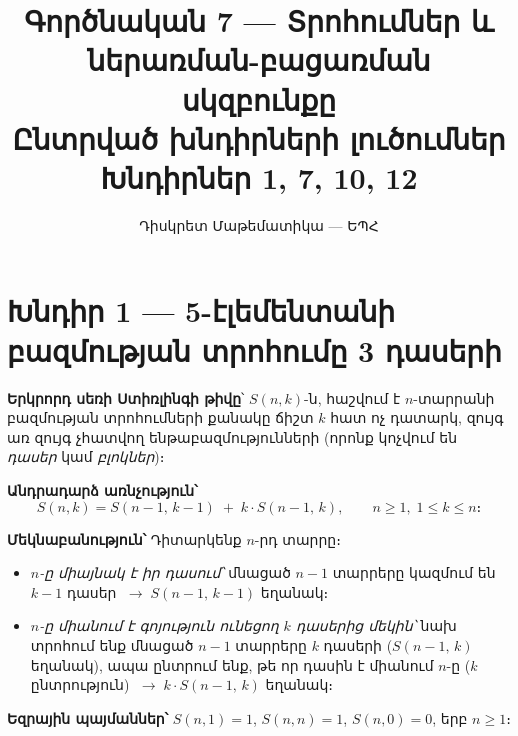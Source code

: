 \documentclass[12pt, a4paper]{article}
\title{\textbf{Գործնական 7 — Տրոհումներ և ներառման-բացառման սկզբունքը}\\[4pt]
       \large Ընտրված խնդիրների լուծումներ\\[2pt]
       \normalsize Խնդիրներ 1, 7, 10, 12}
\author{Դիսկրետ Մաթեմատիկա — ԵՊՀ}
\date{}
\begin{document}
\maketitle
\tableofcontents
\newpage

\section{Խնդիր 1 — 5-էլեմենտանի բազմության տրոհումը 3 դասերի}

\begin{theorybox}
\textbf{Երկրորդ սեռի Ստիռլինգի թիվը}՝ $S(n,k)$-ն, հաշվում է $n$-տարրանի բազմության տրոհումների քանակը ճիշտ $k$ հատ ոչ դատարկ, զույգ առ զույգ չհատվող ենթաբազմությունների (որոնք կոչվում են \emph{դասեր} կամ \emph{բլոկներ})։

\medskip
\textbf{Անդրադարձ առնչություն՝}
\[
  S(n,k) = S(n-1,\, k-1) \;+\; k \cdot S(n-1,\, k),
  \qquad n \ge 1,\; 1 \le k \le n։
\]

\textbf{Մեկնաբանություն՝}\; Դիտարկենք $n$-րդ տարրը։
\begin{itemize}[nosep]
  \item \emph{$n$-ը միայնակ է իր դասում՝}\;
        մնացած $n-1$ տարրերը կազմում են $k-1$ դասեր
        $\;\longrightarrow\; S(n-1,\,k-1)$ եղանակ։
  \item \emph{$n$-ը միանում է գոյություն ունեցող $k$ դասերից մեկին՝}\;
        նախ տրոհում ենք մնացած $n-1$ տարրերը $k$ դասերի
        ($S(n-1,\,k)$ եղանակ), ապա ընտրում ենք, թե որ դասին է միանում $n$-ը ($k$ ընտրություն)
        $\;\longrightarrow\; k \cdot S(n-1,\,k)$ եղանակ։
\end{itemize}

\medskip
\textbf{Եզրային պայմաններ՝}\;
$S(n,1) = 1$,\; $S(n,n) = 1$,\; $S(n,0) = 0$, երբ $n \ge 1$։

\begin{center}
\end{center}
\end{theorybox}
\end{document}
